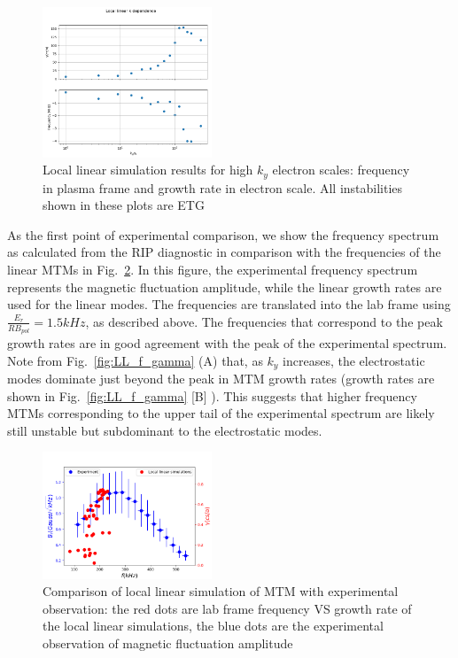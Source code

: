 \documentclass[
 aip,
 amsmath,amssymb,
 reprint
]{revtex4-1}
\begin{document}
\begin{figure}[ht]
        \includegraphics[width=0.45\textwidth]{5.png}
        \centering
        \caption[font=5]{Local linear simulation results for high $k_y$ electron scales: frequency in plasma frame and growth rate in electron scale. All instabilities shown in these plots are ETG}
        \label{fig:LL_ETG}
\end{figure}

As the first point of experimental comparison, we show the frequency spectrum as calculated from the RIP diagnostic in comparison with the frequencies of the linear MTMs in Fig.~\ref{fig:LL_exp}.  In this figure, the experimental frequency spectrum represents the magnetic fluctuation amplitude, while the linear growth rates are used for the linear modes.  The frequencies are translated into the lab frame using $\frac{E_r}{R B_{pol}} = 1.5 kHz$, as described above. %
The frequencies that correspond to the peak growth rates are in good agreement with the peak of the experimental spectrum.  Note from Fig.~\ref{fig:LL_f_gamma} (A) that, as $k_y$ increases, the electrostatic modes dominate just beyond the peak in MTM growth rates (growth rates are shown in Fig.~\ref{fig:LL_f_gamma} [B] ).  This suggests that higher frequency MTMs corresponding to the upper tail of the experimental spectrum are likely still unstable but subdominant to the electrostatic modes.  

\begin{figure}[ht]
        \includegraphics[width=0.45\textwidth]{6.png}
        \centering
        \caption[font=5]{Comparison of local linear simulation of MTM with experimental observation: the red dots are lab frame frequency VS growth rate of the local linear simulations, the blue dots are the experimental observation of magnetic fluctuation amplitude}
        \label{fig:LL_exp}
\end{figure}
\end{document}

